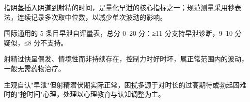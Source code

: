 \item[IELT（阴道内射精潜伏期）] 指阴茎插入阴道到射精的时间，是量化早泄的核心指标之一；规范测量采用秒表法，连续记录多次取中位数，以减少单次波动的影响。
\item[PEDT（早泄诊断工具）] 国际通用的 5 条目早泄自评量表，总分 0--20 分：≥11 分支持早泄诊断，9--10 分疑似，≤8 分不支持。
\item[自然变异性早泄] 射精过快呈偶发、情境性而非持续存在，控制力时好时坏，属正常范围内的波动，一般无需药物治疗。
\item[早泄样射精功能障碍] 主观自认"早泄"但射精潜伏期实际正常，困扰多源于对时长的过高期待或勃起困难时的"抢时间"心理，处理以心理教育与认知调整为主。
